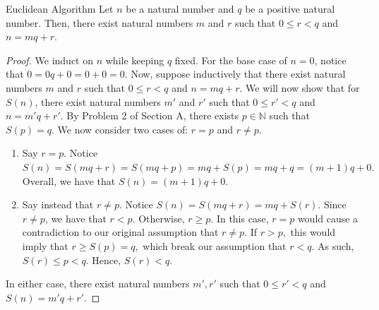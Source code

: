 \begin{problem}{Euclidean Algorithm}
    Let $n$ be a natural number and $q$ be a positive natural number. 
    Then, there exist natural numbers $m$ and $r$ such that $0 \leq r < q$ and $n = mq + r.$
\end{problem}
\begin{proof}
    We induct on $n$ while keeping $q$ fixed.  
    For the base case of $n = 0$, notice that $0 = 0q + 0 = 0 + 0 = 0.$
    Now, suppose inductively that there exist natural numbers $m$ and $r$ such that $0 \leq r < q$ and $n = mq + r.$
    We will now show that for $S(n)$, there exist natural numbers $m'$ and $r'$ such that $0 \leq r' < q$ and $n = m'q + r'.$
    By Problem 2 of Section A, there exists $p \in \mathbb{N}$ such that $S(p) = q.$ 
    We now consider two cases of: $r = p$ and $r \neq p$.
    \begin{enumerate}
        \item Say $r = p.$ 
        Notice $S(n) = S(mq + r) = S(mq + p) = mq + S(p) = mq + q = (m + 1)q + 0.$ 
        Overall, we have that $S(n) = (m + 1)q + 0.$
        \item Say instead that $r \neq p$. 
        Notice $S(n) = S(mq + r) = mq + S(r).$ 
        Since $r \neq p$, we have that $r < p$. 
        Otherwise, $r \geq p$. 
        In this case, $r = p$ would cause a contradiction to our original assumption that $r \neq p$.
        If $r > p,$ this would imply that $r \geq S(p) = q,$ which break our assumption that $r < q.$ 
        As such, $S(r) \leq p < q.$ Hence, $S(r) < q.$
    \end{enumerate}
    In either case, there exist natural numbers $m', r'$ such that $0 \leq r' < q$ and $S(n) = m'q + r'.$
    
\end{proof}